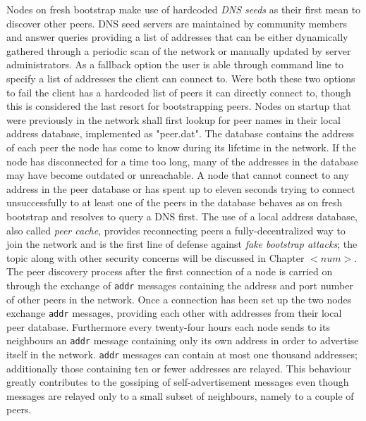 \documentclass[12pt, letterpaper, twoside]{article}
\begin{document}
Nodes on fresh bootstrap make use of hardcoded \emph{DNS seeds} as their first mean to discover other peers. DNS seed servers are maintained by community members and answer queries providing a list of addresses that can be either dynamically gathered through a periodic scan of the network or manually updated by server administrators. As a fallback option the user is able through command line to specify a list of addresses the client can connect to. Were both these two options to fail the client has a hardcoded list of peers it can directly connect to, though this is considered the last resort for bootstrapping peers. Nodes on startup that were previously in the network shall first lookup for peer names in their local address database, implemented as "peer.dat". The database contains the address of each peer the node has come to know during its lifetime in the network. If the node has disconnected for a time too long, many of the addresses in the database may have become outdated or unreachable. A node that cannot connect to any address in the peer database or has spent up to eleven seconds trying to connect unsuccessfully to at least one of the peers in the database behaves as on fresh bootstrap and resolves to query a DNS first. The use of a local address database, also called \emph{peer cache}, provides reconnecting peers a fully-decentralized way to join the network and is the first line of defense against \emph{fake bootstrap attacks}; the topic along with other security concerns will be discussed in Chapter $<num>$.\\
The peer discovery process after the first connection of a node is carried on through the exchange of \texttt{addr} messages containing the address and port number of other peers in the network. Once a connection has been set up the two nodes exchange \texttt{addr} messages, providing each other with addresses from their local peer database. Furthermore every twenty-four hours each node sends to its neighbours an \texttt{addr} message containing only its own address in order to advertise itself in the network. \texttt{addr} messages can contain at most one thousand addresses; additionally those containing ten or fewer addresses are relayed. This behaviour greatly contributes to the gossiping of self-advertisement messages even though messages are relayed only to a small subset of neighbours, namely to a couple of peers.
\end{document}
